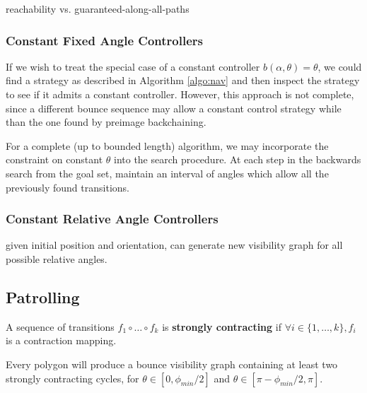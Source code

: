 \documentclass[]{svproc}  %
\begin{document}
reachability vs. guaranteed-along-all-paths


\subsubsection{Constant Fixed Angle Controllers}

If we wish to treat the special case of a constant controller $b(\alpha, \theta)
= \theta$, we could find a strategy as described in Algorithm \ref{algo:nav} and
then inspect the strategy to see if it admits a constant controller. However,
this approach is not complete, since a different bounce sequence may allow a
constant control strategy while than the one found by preimage backchaining.

For a complete (up to bounded length) algorithm, we may incorporate the
constraint on constant $\theta$ into the search procedure. At each step in the
backwards search from the goal set, maintain an interval of angles which allow
all the previously found transitions.

\subsubsection{Constant Relative Angle Controllers}

given initial position and orientation, can generate new visibility graph for
all possible relative angles.

\subsection{Patrolling \label{sec:cycles}}



\begin{definition}
A sequence of transitions $f_1 \circ \ldots \circ f_k$ is \textbf{strongly
contracting} if $\forall i \in \{1, \ldots, k\}, f_i$ is a contraction mapping.
\end{definition}

\begin{corollary}
Every polygon will produce a bounce visibility graph containing at least two
strongly contracting cycles, for $\theta \in [0, \phi_{min}/2]$ and $\theta \in
[\pi - \phi_{min}/2, \pi]$.
\end{corollary}
\end{document}
